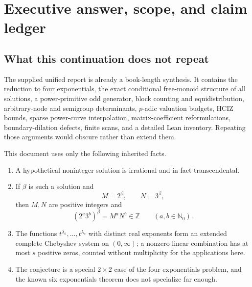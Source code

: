 \documentclass[11pt,oneside]{article}
\theoremstyle{definition}
\theoremstyle{remark}
\newcommand{\Nzero}{\mathbb N_0}
\newcommand{\Z}{\mathbb Z}
\begin{document}
\begin{abstract}
The report closes by formulating precise sufficient conditions in the ring of
integer-valued polynomials on the $3$-smooth semigroup, by connecting them with Bhargava
$p$-orderings and generalized factorials, and by auditing rational, Pad\'e,
Hermite--Pad\'e, orthogonal-polynomial, and probabilistic-rounding approaches.  Recent work
on matrix coefficients, exponential-product transcendence, discrete Chebyshev systems, and
integer-valued polynomial bases sharpens the available language but does not remove the
rank-two four-exponentials obstruction.
\end{abstract}

\tableofcontents
\clearpage
{}

\section{Executive answer, scope, and claim ledger}
\label{sec:executive}

\subsection{What this continuation does not repeat}

The supplied unified report is already a book-length synthesis.  It contains the reduction to
four exponentials, the exact conditional free-monoid structure of all solutions, a
power-primitive odd generator, block counting and equidistribution, arbitrary-node and
semigroup determinants, $p$-adic valuation budgets, HCIZ bounds, sparse power-curve
interpolation, matrix-coefficient reformulations, boundary-dilation defects, finite scans,
and a detailed Lean inventory.  Repeating those arguments would obscure rather than extend
them.

This document uses only the following inherited facts.

\begin{enumerate}
\item A hypothetical noninteger solution is irrational and in fact transcendental.
\item If $\beta$ is such a solution and
      \[
        M=2^\beta,\qquad N=3^\beta,
      \]
      then $M,N$ are positive integers and
      \[
        (2^a3^b)^\beta=M^aN^b\in\Z
        \qquad(a,b\in\Nzero).
      \]
\item The functions $t^{\lambda_0},\ldots,t^{\lambda_s}$ with distinct real exponents form
      an extended complete Chebyshev system on $(0,\infty)$; a nonzero linear combination has
      at most $s$ positive zeros, counted without multiplicity for the applications here.
\item The conjecture is a special $2\times2$ case of the four exponentials problem, and the
      known six exponentials theorem does not specialize far enough.
\end{enumerate}
\end{document}
